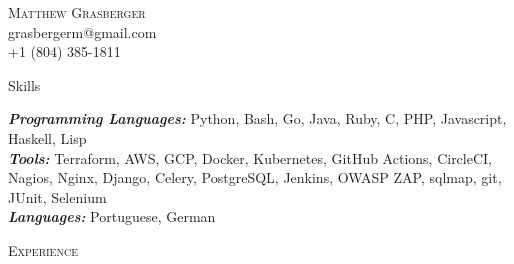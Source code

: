 \documentclass[9pt]{article}
\newenvironment{changemargin}[2]{%
  \begin{list}{}{%
    \setlength{\topsep}{0pt}%
    \setlength{\leftmargin}{#1}%
    \setlength{\rightmargin}{#2}%
    \setlength{\listparindent}{\parindent}%
    \setlength{\itemindent}{\parindent}%
    \setlength{\parsep}{\parskip}%
  }%
  \item[]}{\end{list}
}
\newcommand{\lineover}{
	\begin{changemargin}{-0.05in}{-0.05in}
		\vspace*{-8pt}
		\hrulefill \\
		\vspace*{-2pt}
	\end{changemargin}
}
\newcommand{\header}[1]{
	\begin{changemargin}{-0.5in}{-0.5in}
		\scshape{#1}\\
  	\lineover
	\end{changemargin}
}
\newcommand{\contact}[4]{
	\begin{changemargin}{-0.5in}{-0.5in}
		\begin{center}
			{\Large \scshape {#1}}\\ \smallskip
			{#2}\\ \smallskip 
			{#3}\\ \smallskip
			{#4}\smallskip
		\end{center}
	\end{changemargin}
}
\newenvironment{body} {
	\vspace*{-10pt}
	\begin{changemargin}{-0.25in}{-0.5in}
  }	
	{\end{changemargin}
}
\begin{document}
\contact{Matthew Grasberger}{grasbergerm@gmail.com}{+1 (804) 385-1811}


%
%
%
%
\header{Skills}

\begin{body}
	\vspace{14pt}
	\emph{\textbf{Programming Languages:}} Python, Bash, Go, Java, Ruby, C, PHP, Javascript, Haskell, Lisp\\
	\smallskip
	\emph{\textbf{Tools:}} Terraform, AWS, GCP, Docker, Kubernetes, GitHub Actions, CircleCI, Nagios, Nginx, Django, Celery, PostgreSQL, Jenkins, OWASP ZAP, sqlmap, git, JUnit, Selenium\\
	\smallskip
	\emph{\textbf{Languages:}} Portuguese, German\\
\end{body}
\vspace{14pt}
\header{Experience}
\end{document}
